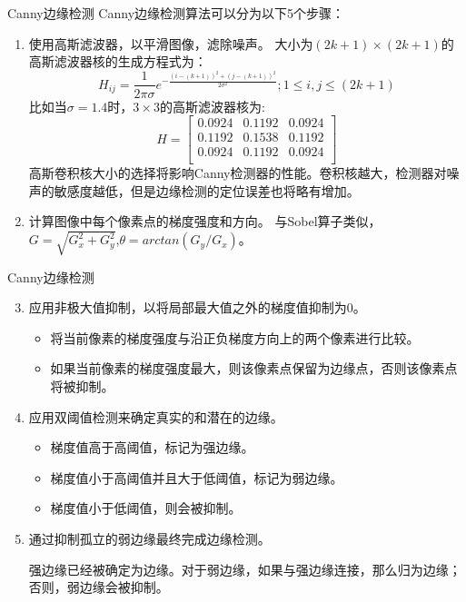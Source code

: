 \documentclass[10.5pt]{beamer}
\begin{document}
\begin{frame}{Canny边缘检测}
Canny边缘检测算法可以分为以下5个步骤：
\begin{enumerate}
\item 使用高斯滤波器，以平滑图像，滤除噪声。
	大小为$(2k+1) \times (2k+1)$的高斯滤波器核的生成方程式为：
	$$H_{ij} = \frac{1}{2 \pi \sigma} e ^ {-\frac{(i-(k+1))^{2} + (j-(k+1))^{2}}{2 \sigma^{2}}}; 1 \leq i,j \leq (2k+1)$$
	比如当$\sigma = 1.4$时，$3\times 3$的高斯滤波器核为:
	$$
	H = 
	\begin{bmatrix}
	0.0924 & 0.1192 & 0.0924\\
	0.1192 & 0.1538 & 0.1192\\
	0.0924 & 0.1192 & 0.0924\\	
	\end{bmatrix}
	$$
	高斯卷积核大小的选择将影响Canny检测器的性能。卷积核越大，检测器对噪声的敏感度越低，但是边缘检测的定位误差也将略有增加。
\item 计算图像中每个像素点的梯度强度和方向。
	与Sobel算子类似，$G = \sqrt{G_{x}^{2} + G_{y}^{2}}$,$\theta = arctan(G_{y}/G_{x})$。
\end{enumerate}

\end{frame}

\begin{frame}{Canny边缘检测}
\begin{enumerate}
\setcounter{enumi}{2}
\item 应用非极大值抑制，以将局部最大值之外的梯度值抑制为0。
	\begin{itemize}
	\item 将当前像素的梯度强度与沿正负梯度方向上的两个像素进行比较。
	\item  如果当前像素的梯度强度最大，则该像素点保留为边缘点，否则该像素点将被抑制。
	\end{itemize}
\item 应用双阈值检测来确定真实的和潜在的边缘。
	\begin{itemize}
	\item 梯度值高于高阈值，标记为强边缘。
	\item 梯度值小于高阈值并且大于低阈值，标记为弱边缘。
	\item 梯度值小于低阈值，则会被抑制。
	\end{itemize}

\item 通过抑制孤立的弱边缘最终完成边缘检测。
	
	强边缘已经被确定为边缘。对于弱边缘，如果与强边缘连接，那么归为边缘；否则，弱边缘会被抑制。
\end{enumerate}

\end{frame}
\end{document}
